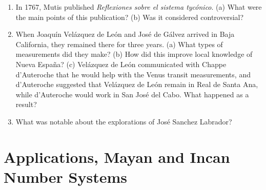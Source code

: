 \documentclass[10pt]{article}
\begin{document}
\begin{enumerate}
\item In 1767, Mutis published \textit{Reflexiones sobre el sistema tyc\'{o}nico}. (a) What were the main points of this publication?  (b) Was it considered controversial? \\ \vspace{1cm}
\item When Joaqu\'{i}n Vel\'{a}zquez de Le\'{o}n and Jos\'{e} de G\'{a}lvez arrived in Baja California, they remained there for three years.  (a) What types of measurements did they make? (b) How did this improve local knowledge of Nueva Espa\~{n}a? (c) Vel\'{a}zquez de Le\'{o}n communicated with Chappe d'Auteroche that he would help with the Venus transit measurements, and d'Auteroche suggested that Vel\'{a}zquez de Le\'{o}n remain in Real de Santa Ana, while d'Auteroche would work in San Jos\'{e} del Cabo.  What happened as a result? \\ \vspace{1cm}
\item What was notable about the explorations of Jos\'{e} Sanchez Labrador? \\ \vspace{1cm}
\end{enumerate}

\section{Applications, Mayan and Incan Number Systems}
\end{document}
